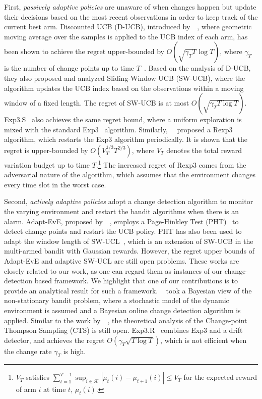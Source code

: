 \documentclass[letterpaper]{article}
\newcommand{\blue}{}
\begin{document}
First, {\em passively adaptive policies} are unaware of when changes happen but update their decisions based on the most recent observations in order to keep track of the current best arm. Discounted UCB (D-UCB), introduced by~\citeauthor{kocsis2006discounted}~, where geometric moving average over the samples is applied to the UCB index of each arm, has been shown to achieve the regret upper-bounded by $O(\sqrt{\gamma_T T}\log T)$, where $\gamma_T$ is the number of change points up to time $T$~\cite{garivier2008upper}. Based on the analysis of D-UCB, they also proposed and analyzed Sliding-Window UCB (SW-UCB), where the algorithm updates the UCB index based on the observations within a moving window of a fixed length. The regret of SW-UCB is at most $O(\sqrt{\gamma_T T\log T})$. Exp3.S~\cite{doi:10.1137/S0097539701398375} also achieves the same regret bound, where a uniform exploration is mixed with the standard Exp3~\cite{cesa2006prediction} algorithm.
Similarly,~\citeauthor{besbes2014stochastic}~ proposed a Rexp3 algorithm, which restarts the Exp3 algorithm periodically. It is shown that the regret is upper-bounded by $O(V_T^{1/3}T^{2/3})$, where $V_T$ denotes the total reward variation budget up to time $T$.\footnote{\blue $V_T$ satisfies $\sum_{t=1}^{T-1} \sup_{i \in \mathcal{K}} |\mu_t(i) - \mu_{t+1}(i)| \leq V_T$ for the expected reward of arm $i$ at time $t$, $\mu_t(i)$.} The increased regret of Rexp3 comes from the adversarial nature of the algorithm, which assumes that the environment changes every time slot
in the worst case.

Second, {\em actively adaptive policies} adopt a change detection algorithm to monitor the varying environment and restart the bandit algorithms when there is an alarm. Adapt-EvE, proposed by~\citeauthor{hartland2007change}~, employs a Page-Hinkley Test (PHT)~\cite{hinkley1971inference} to detect change points and restart the UCB policy. PHT has also been used to adapt the window length of SW-UCL~\cite{srivastava2014surveillance}, which is an extension of SW-UCB in the multi-armed bandit with Gaussian rewards. However, the regret upper bounds of Adapt-EvE and adaptive SW-UCL are still open problems. These works are closely related to our work, as one can regard them as instances of our change-detection based framework. We highlight that one of our contributions is to provide an analytical result for such a framework. \citeauthor{mellor2013thompson}~ took a Bayesian view of the non-stationary bandit problem, where a stochastic model of the dynamic environment is assumed and a Bayesian online change detection algorithm is applied. Similar to the work by~\citeauthor{hartland2007change}~, the theoretical analysis of the Change-point Thompson Sampling (CTS) is still open. Exp3.R~\cite{allesiardo2015exp3} combines Exp3 and a drift detector, and achieves the regret $O(\gamma_T \sqrt{T\log T})$, which is not efficient when the change rate $\gamma_T$ is high.
\end{document}
